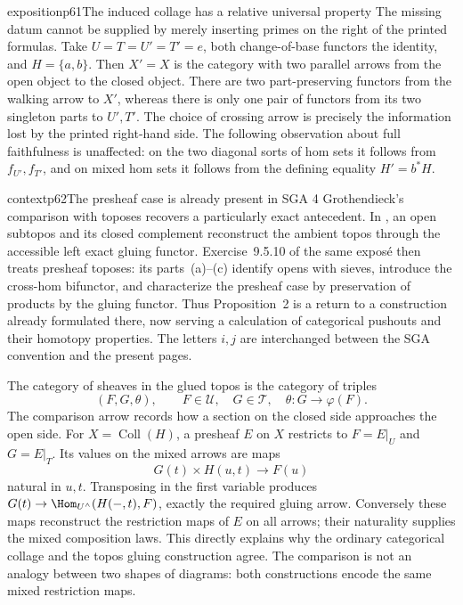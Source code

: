 \begin{dcomment}{exposition}{p61}{The induced collage has a relative universal property}
The missing datum cannot be supplied by merely inserting primes on the right of the printed formulas. Take $U=T=U'=T'=e$, both change-of-base functors the identity, and $H=\{a,b\}$. Then $X'=X$ is the category with two parallel arrows from the open object to the closed object. There are two part-preserving functors from the walking arrow to $X'$, whereas there is only one pair of functors from its two singleton parts to $U',T'$. The choice of crossing arrow is precisely the information lost by the printed right-hand side. The following observation about full faithfulness is unaffected: on the two diagonal sorts of hom sets it follows from $f_{U'},f_{T'}$, and on mixed hom sets it follows from the defining equality $H'=b^*H$.
\end{dcomment}

\begin{dcomment}{context}{p62}{The presheaf case is already present in SGA 4}
Grothendieck's comparison with toposes recovers a particularly exact antecedent. In \citet[Expos\'e~IV, Theorem~9.5.4]{SGA4I1972}, an open subtopos and its closed complement reconstruct the ambient topos through the accessible left exact gluing functor. Exercise~9.5.10 of the same expos\'e then treats presheaf toposes: its parts~(a)--(c) identify opens with sieves, introduce the cross-hom bifunctor, and characterize the presheaf case by preservation of products by the gluing functor. Thus Proposition~2 is a return to a construction already formulated there, now serving a calculation of categorical pushouts and their homotopy properties. The letters $i,j$ are interchanged between the SGA convention and the present pages.

The category of sheaves in the glued topos is the category of triples
\[
 (F,G,\theta),\qquad F\in\mathcal U,\quad G\in\mathcal T,
 \quad\theta:G\longrightarrow\varphi(F).
\]
The comparison arrow records how a section on the closed side approaches the open side. For $X=\operatorname{Coll}(H)$, a presheaf $E$ on $X$ restricts to $F=E|_U$ and $G=E|_T$. Its values on the mixed arrows are maps
\[
 G(t)\times H(u,t)\longrightarrow F(u)
\]
natural in $u,t$. Transposing in the first variable produces $G(t)\to\Hom_{U^\wedge}(H(-,t),F)$, exactly the required gluing arrow. Conversely these maps reconstruct the restriction maps of $E$ on all arrows; their naturality supplies the mixed composition laws. This directly explains why the ordinary categorical collage and the topos gluing construction agree. The comparison is not an analogy between two shapes of diagrams: both constructions encode the same mixed restriction maps.
\end{dcomment}

